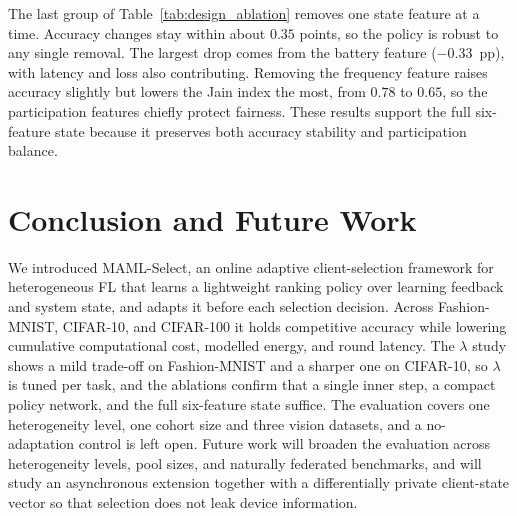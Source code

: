 \documentclass[journal]{IEEEtran}
\theoremstyle{remark}
\newcommand{\revision}[1]{#1}
\newcommand{\revtwo}[1]{#1}
\begin{document}
\revision{The last group of Table~\ref{tab:design_ablation} removes one state feature at a time. Accuracy changes stay within about $0.35$ points, so the policy is robust to any single removal. The largest drop comes from the battery feature ($-0.33$~pp), with latency and loss also contributing. Removing the frequency feature raises accuracy slightly but lowers the Jain index the most, from $0.78$ to $0.65$, so the participation features chiefly protect fairness. These results support the full six-feature state because it preserves both accuracy stability and participation balance.}

\FloatBarrier
\section{Conclusion and Future Work}
\revision{We introduced MAML-Select, an online adaptive client-selection framework for heterogeneous FL that learns a lightweight ranking policy over learning feedback and system state, and adapts it before each selection decision.
Across Fashion-MNIST, CIFAR-10, and CIFAR-100 it holds competitive accuracy while lowering cumulative computational cost, modelled energy, and round latency. The $\lambda$ study shows a mild trade-off on Fashion-MNIST and a sharper one on CIFAR-10, so $\lambda$ is tuned per task, and the ablations confirm that a single inner step, a compact policy network, and the full six-feature state suffice.} \revtwo{The evaluation covers one heterogeneity level, one cohort size and three vision datasets, and a no-adaptation control is left open.} \revision{Future work will broaden the evaluation across heterogeneity levels, pool sizes, and naturally federated benchmarks, and will study an asynchronous extension together with a differentially private client-state vector so that selection does not leak device information.}
\end{document}
